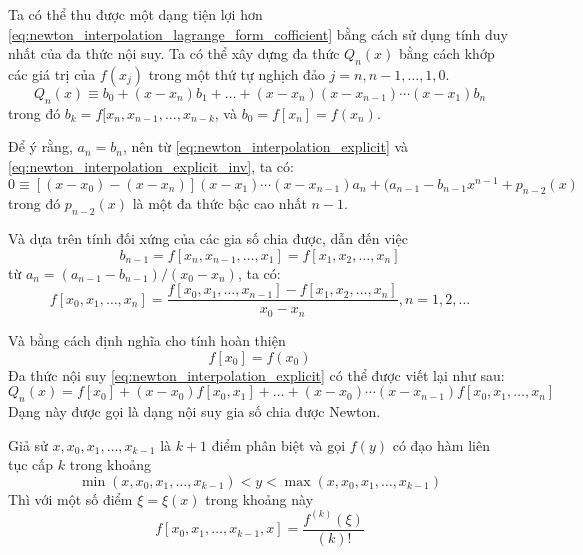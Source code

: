 Ta có thể thu được một dạng tiện lợi hơn \eqref{eq:newton_interpolation_lagrange_form_cofficient} bằng cách sử dụng tính duy nhất của đa thức nội suy. Ta có thể xây dựng đa thức $Q_n(x)$ bằng cách khớp các giá trị của $f(x_j)$ trong một thứ tự nghịch đảo $j = n, n-1, \dots, 1, 0$.
\begin{equation}
    \label{eq:newton_interpolation_explicit_inv}
    Q_n(x) \equiv b_0 + (x - x_n)b_1 + \dots + (x-x_n)(x-x_{n-1})\cdots(x-x_1)b_n
\end{equation}
trong đó $b_k = f[x_n, x_{n-1}, \dots, x_{n-k}$, và $b_0 = f[x_n] = f(x_n)$.

Để ý rằng, $a_n = b_n$, nên từ \eqref{eq:newton_interpolation_explicit} và \eqref{eq:newton_interpolation_explicit_inv}, ta có:
\begin{equation}
0 \equiv [(x-x_0) - (x-x_n)](x-x_1)\cdots(x-x_{n-1})a_n + (a_{n-1}-b_{n-1}x^{n-1} + p_{n-2}(x)    
\end{equation}
trong đó $p_{n-2}(x)$ là một đa thức bậc cao nhất $n-1$.

Và dựa trên tính đối xứng của các gia số chia được, dẫn đến việc
\begin{equation}
    b_{n-1} = f[x_n, x_{n-1}, \dots, x_1] = f[x_1, x_2, \dots, x_n]
\end{equation}
từ $a_n = (a_{n-1} - b_{n-1}) / (x_0 - x_n)$, ta có:
\begin{equation}
    \label{eq:newton_interpolation_ddcoff}
    f[x_0, x_1, \dots, x_n] = \frac{f[x_0, x_1, \dots, x_{n-1}] - f[x_1, x_2, \dots, x_n]}{x_0 - x_n}, n = 1, 2, \dots
\end{equation}

Và bằng cách định nghĩa cho tính hoàn thiện
\begin{equation}
    f[x_0] = f(x_0)
\end{equation}
Đa thức nội suy \eqref{eq:newton_interpolation_explicit} có thể được viết lại như sau:
\begin{equation}
    \label{eq:newton_interpolation_dd}
    Q_n(x) = f[x_0] + (x-x_0)f[x_0, x_1] + \dots + (x-x_0)\cdots(x-x_{n-1})f[x_0, x_1, \dots, x_n]
\end{equation}
Dạng này được gọi là dạng nội suy gia số chia được Newton.

\begin{theorem}
    Giả sử $x, x_0, x_1, \dots, x_{k-1}$ là $k+1$ điểm phân biệt và gọi $f(y)$ có đạo hàm liên tục cấp $k$ trong khoảng
    \begin{equation}
        \min(x, x_0, x_1, \dots, x_{k-1}) < y < \max(x, x_0, x_1, \dots, x_{k-1})
    \end{equation}
    Thì với một số điểm $\xi = \xi(x)$ trong khoảng này
    \begin{equation}
        f[x_0, x_1, \dots, x_{k-1}, x] = \frac{f^{(k)}(\xi)}{(k)!}
    \end{equation}
\end{theorem}


